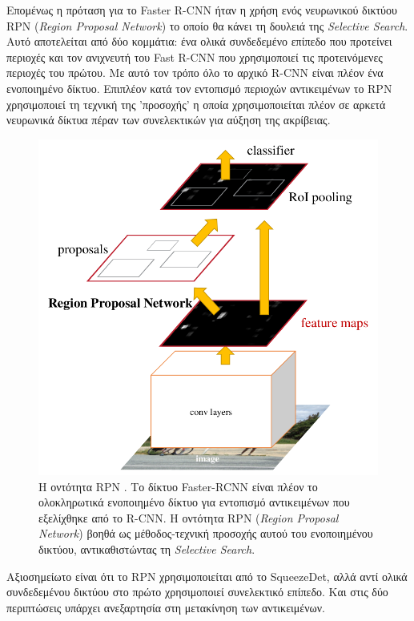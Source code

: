 Επομένως η πρόταση για το Faster R-CNN ήταν η χρήση ενός νευρωνικού δικτύου RPN (\textit{Region Proposal Network}) το οποίο θα κάνει τη δουλειά της \textit{Selective Search}. Αυτό αποτελείται από δύο κομμάτια: ένα ολικά συνδεδεμένο επίπεδο που προτείνει περιοχές και τον ανιχνευτή του Fast R-CNN που χρησιμοποιεί τις προτεινόμενες περιοχές του πρώτου. Με αυτό τον τρόπο όλο το αρχικό R-CNN είναι πλέον ένα ενοποιημένο δίκτυο. Επιπλέον κατά τον εντοπισμό περιοχών αντικειμένων το RPN χρησιμοποιεί τη τεχνική της 'προσοχής'\cite{14} η οποία χρησιμοποιείται πλέον σε αρκετά νευρωνικά δίκτυα πέραν των συνελεκτικών για αύξηση της ακρίβειας.

\begin{figure}
\centering
\includegraphics[width = \textwidth]{figures/RCNN/Faster-RCNN_RPN.png}
\caption[Η οντότητα RPN]{Η οντότητα RPN \cite{12}. Το δίκτυο Faster-RCNN είναι πλέον το ολοκληρωτικά ενοποιημένο δίκτυο για εντοπισμό αντικειμένων που εξελίχθηκε από το R-CNN. Η οντότητα RPN (\textit{Region Proposal Network}) βοηθά ως μέθοδος-τεχνική προσοχής αυτού του ενοποιημένου δικτύου, αντικαθιστώντας τη \textit{Selective Search}.}
\label{fig:Faster-RCNN_RPN}
\end{figure}

Αξιοσημείωτο είναι ότι το RPN χρησιμοποιείται από το SqueezeDet, αλλά αντί ολικά συνδεδεμένου δικτύου στο πρώτο χρησιμοποιεί συνελεκτικό επίπεδο. Και στις δύο περιπτώσεις υπάρχει ανεξαρτησία στη μετακίνηση των αντικειμένων.

